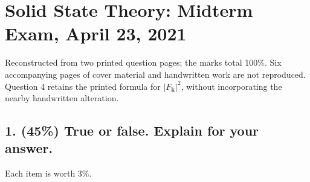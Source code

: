 \chapter{Solid State Theory: Midterm Exam, April 23, 2021}
\label{q:theory-2021-04-midterm}
\begin{sourceNote}
Reconstructed from two printed question pages; the marks total 100\%. Six accompanying pages of cover material and handwritten work are not reproduced. Question 4 retains the printed formula for $|F_{\mathbf k}|^2$, without incorporating the nearby handwritten alteration.
\end{sourceNote}

\section*{1. (45\%) True or false. Explain for your answer.}
Each item is worth 3\%.
